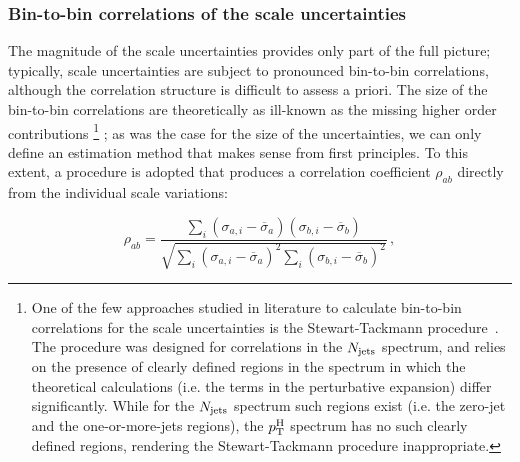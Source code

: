 \begin{table}[htb]
\centering
{}
\label{tab:scaleunc-ktcgkb}
\setlength{\tabcolsep}{2pt}
\begin{tabular}{lccccccccc}
\hline

\hline
\end{tabular}
\end{table}


\subsubsection{Bin-to-bin correlations of the scale uncertainties}

The magnitude of the scale uncertainties provides only part of the full picture; typically, scale uncertainties are subject to pronounced bin-to-bin correlations, although the correlation structure is difficult to assess a priori.
% 
The size of the bin-to-bin correlations are theoretically as ill-known as the missing higher order contributions%
% 
\footnote{%
One of the few approaches studied in literature to calculate bin-to-bin correlations for the scale uncertainties is the Stewart-Tackmann procedure~\cite{Stewart:2011cf}.
% 
The procedure was designed for correlations in the $N_\text{jets} $ spectrum, and relies on the presence of clearly defined regions in the spectrum in which the theoretical calculations (i.e. the terms in the perturbative expansion) differ significantly.
% 
While for the $N_\text{jets} $ spectrum such regions exist (i.e. the zero-jet and the one-or-more-jets regions), the $p_\mathrm{T}^\mathrm{H}$ spectrum has no such clearly defined regions, rendering the Stewart-Tackmann procedure inappropriate.
}
% 
; as was the case for the size of the uncertainties, we can only define an estimation method that makes sense from first principles.
% 
To this extent, a procedure is adopted that produces a correlation coefficient $\rho_{ab}$ directly from the individual scale variations:
% 
\begin{linenomath*}
\begin{equation}
\rho_{ab} = 
\frac{
    \sum_i ( \sigma_{a, i} - \overline{\sigma}_a ) ( \sigma_{b, i} - \overline{\sigma}_b )
    }{
    \sqrt{
        \sum_i ( \sigma_{a, i} - \overline{\sigma}_a )^2
        \sum_i ( \sigma_{b, i} - \overline{\sigma}_b )^2
        }
    }
    \,,
\end{equation}
\end{linenomath*}
